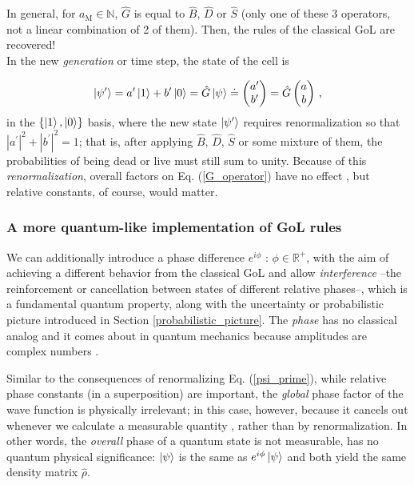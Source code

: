 \documentclass[11pt]{article}
\numberwithin{equation}{section} %
\numberwithin{figure}{section} %
\begin{document}
In general, for $a_{\textrm{M}}\in\mathbb{N}$, $\hat{G}$ is equal to $\hat{B}$, $\hat{D}$ or $\hat{S}$ (only one of these 3 operators, not a linear combination of 2 of them). Then, the rules of the classical GoL are recovered!\\

In the new \emph{generation} or time step, the state of the cell is

\begin{equation} \label{psi_prime}
\ket{\psi^\prime}=a^\prime\ket{1}+b^\prime\ket{0}=\hat{G}\ket{\psi}\doteq \begin{pmatrix} a^\prime \\ b^\prime \end{pmatrix}=\hat{G}\begin{pmatrix} a \\ b \end{pmatrix}\,\textrm{,}
\end{equation}
in the $\{\ket{1},\ket{0}\}$ basis, where the new state $\ket{\psi^\prime}$ requires renormalization so that $|a^\prime|^2+|b^\prime|^2=1$; that is, after applying $\hat{B}$, $\hat{D}$, $\hat{S}$ or some mixture of them, the probabilities of being dead or live must still sum to unity. Because of this \emph{renormalization}, overall factors on Eq. (\ref{G_operator}) have no effect \cite[p.~3, Eq.~(10)]{Flitney}, but relative constants, of course, would matter.\\

\subsubsection{A more quantum-like implementation of GoL rules } \label{GoL quantum with phase}

We can additionally introduce a phase difference $e^{i\phi}$ : $\phi\in\mathbb{R}^+$, with the aim of achieving a different behavior from the classical GoL and allow \emph{interference} --the reinforcement or cancellation between states of different relative phases--, which is a fundamental quantum property, along with the uncertainty or probabilistic picture introduced in Section \ref{probabilistic_picture}. The \emph{phase} has no classical analog and it comes about in quantum mechanics because amplitudes are complex numbers \cite[p.~2, l.~65-68]{Grover}.

Similar to the consequences of renormalizing Eq. (\ref{psi_prime}), while relative phase constants (in a superposition) are important, the \emph{global} phase factor of the wave function is physically irrelevant; in this case, however, because it cancels out whenever we calculate a measurable quantity \cite[p.~39, l.~14-16]{Griffiths} \cite[p.~15, Eq.~(1.3) \& p.~93, l.~10-17]{Nielsen}, rather than by renormalization. In other words, the \emph{overall} phase of a quantum state is not measurable, has no quantum physical significance: $\ket{\psi}$ is the same as $e^{i\phi}\ket{\psi}$ and both yield the same density matrix $\hat{\rho}$.\\
\end{document}

